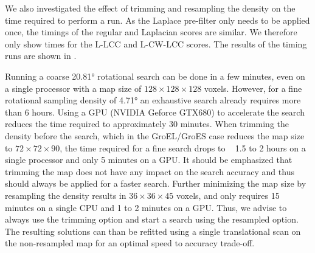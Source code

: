 {}


We also investigated the effect of trimming and resampling the density on the
time required to perform a run. As the Laplace pre-filter only needs to be
applied once, the timings of the regular and Laplacian scores are similar. We
therefore only show times for the L-LCC and L-CW-LCC scores. The results of the
timing runs are shown in .


Running a coarse 20.81° rotational search can be done in a few minutes, even on
a single processor with a map size of $128 \times 128 \times 128$ voxels.
However, for a fine rotational sampling density of 4.71° an exhaustive search
already requires more than 6 hours. Using a GPU (NVIDIA Geforce GTX680) to
accelerate the search reduces the time required to approximately 30 minutes.
When trimming the density before the search, which in the GroEL/GroES case
reduces the map size to $72 \times 72 \times 90$, the time required for a fine
search drops to ~ 1.5 to 2 hours on a single processor and only 5 minutes on a
GPU. It should be emphasized that trimming the map does not have any impact on
the search accuracy and thus should always be applied for a faster search.
Further minimizing the map size by resampling the density results in $36 \times
36 \times 45$ voxels, and only requires 15 minutes on a single CPU and 1 to 2
minutes on a GPU. Thus, we advise to always use the trimming option and start a
search using the resampled option. The resulting solutions can than be refitted
using a single translational scan on the non-resampled map for an optimal speed
to accuracy trade-off.

{}


